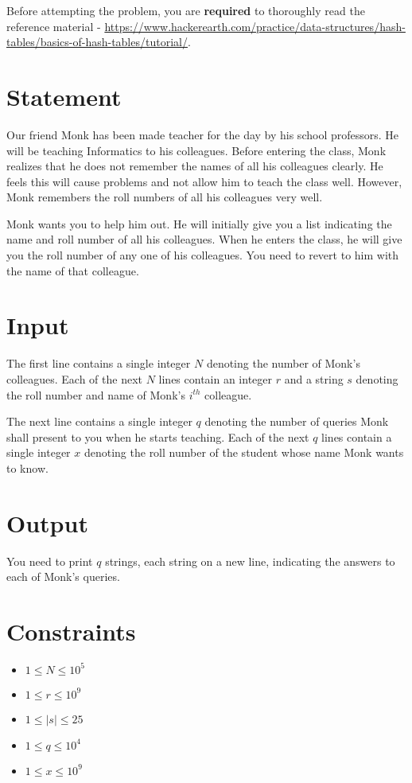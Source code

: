 \documentclass{article}
\begin{document}
Before attempting the problem, you are \textbf{required} to thoroughly read the reference material - \url{https://www.hackerearth.com/practice/data-structures/hash-tables/basics-of-hash-tables/tutorial/}.


\section*{Statement}

Our friend Monk has been made teacher for the day by his school professors. He will be teaching Informatics to his colleagues. Before entering the class, Monk realizes that he does not remember the names of all his colleagues clearly. He feels this will cause problems and not allow him to teach the class well. However, Monk remembers the roll numbers of all his colleagues very well.

Monk wants you to help him out. He will initially give you a list indicating the name and roll number of all his colleagues. When he enters the class, he will give you the roll number of any one of his colleagues. You need to revert to him with the name of that colleague.

\section*{Input}

The first line contains a single integer $N$ denoting the number of Monk's colleagues. Each of the next $N$ lines contain an integer $r$ and a string $s$ denoting the roll number and name of Monk's $i^{th}$ colleague.

The next line contains a single integer $q$ denoting the number of queries Monk shall present to you when he starts teaching. Each of the next $q$ lines contain a single integer $x$ denoting the roll number of the student whose name Monk wants to know.

\section*{Output}

You need to print $q$ strings, each string on a new line, indicating the answers to each of Monk's queries. 

\section*{Constraints}

\begin{itemize}
    \item $1 \le N \le 10^{5}$
    \item $1 \le r \le 10^{9}$
    \item $1 \le |s| \le 25$
    \item $1 \le q \le 10^{4}$
    \item $1 \le x \le 10^{9}$
\end{itemize}
\end{document}
